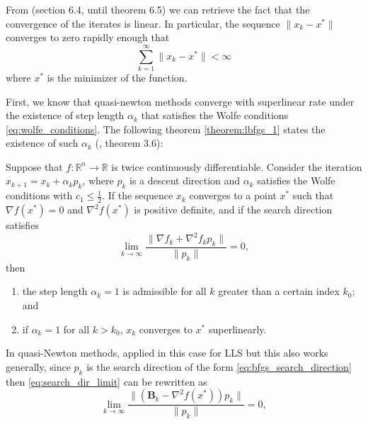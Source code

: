 \noindent From \cite{nocedal1999numerical} (section 6.4, until theorem 6.5) we can retrieve the fact that the convergence of the iterates is linear. In particular, the sequence $\lVert x_k - x^* \rVert$ converges to zero rapidly enough that
\begin{equation}
    \sum_{k=1}^{\infty} \lVert x_k - x^* \rVert < \infty
    \label{eq:lbfgs_conv_rate}
\end{equation}
where $x^*$ is the minimizer of the function.
\vspace{3mm}

\noindent First, we know that quasi-newton methods converge with superlinear rate under the existence of step length $\alpha_k$ that satisfies the Wolfe conditions \eqref{eq:wolfe_conditions}. The following theorem \ref{theorem:lbfgs_1} states the existence of such $\alpha_k$ (\cite{nocedal1999numerical}, theorem 3.6):
\begin{theorem}
    Suppose that $f : \mathbb{R}^{n} \xrightarrow{} \mathbb{R}$ is twice continuously differentiable. Consider the iteration $x_{k+1} = x_{k} + \alpha_k p_{k}$, where $p_k$ is a descent direction and $\alpha_k$ satisfies the Wolfe conditions with $c_1 \leq \frac{1}{2}$. If the sequence {$x_k$} converges to a point $x^*$ such that $\nabla f(x^*) = 0$ and $\nabla^2 f(x^*)$ is positive definite, and if the search direction satisfies
    \begin{equation}
        \lim_{k \xrightarrow{} \infty} \frac{\lVert \nabla f_k + \nabla^2 f_k p_k\rVert}{\lVert p_k \rVert} = 0,
        \label{eq:search_dir_limit}
    \end{equation}
    then \begin{enumerate}
        \item the step length $\alpha_k = 1$ is admissible for all $k$ greater than a certain index $k_0$; and
        \item if $\alpha_k = 1$ for all $k > k_0$, {$x_k$} converges to $x^*$ superlinearly.
    \end{enumerate}
    \label{theorem:lbfgs_1}
\end{theorem}

\noindent In quasi-Newton methods, applied in this case for LLS but this also works generally, since $p_k$ is the search direction of the form \eqref{eq:bfgs_search_direction} then \autoref{eq:search_dir_limit} can be rewritten as
\begin{equation}
    \lim_{k \xrightarrow{} \infty} \frac{\lVert (\mathbf{B}_k - \nabla^2 f(x^*))p_k\rVert}{\lVert p_k \rVert} = 0,
    \label{eq:lim_dir_quasi_newton}
\end{equation}

